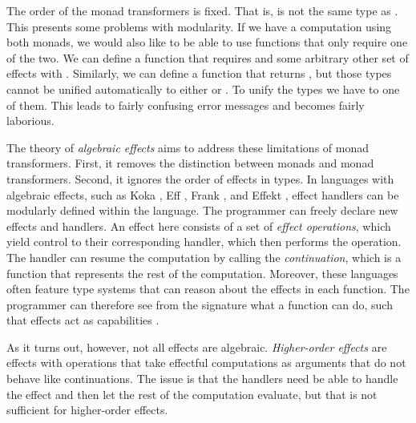 The order of the monad transformers is fixed. That is,  is not the same type as . This presents some problems with modularity. If we have a computation using both monads, we would also like to be able to use functions that only require one of the two. We can define a function that requires  and some arbitrary other set of effects with . Similarly, we can define a function that returns , but those types cannot be unified automatically to either  or . To unify the types we have to  one of them. This leads to fairly confusing error messages and becomes fairly laborious.

%
%

The theory of \emph{algebraic effects} aims to address these limitations of monad transformers. First, it removes the distinction between monads and monad transformers. Second, it ignores the order of effects in types. In languages with algebraic effects, such as Koka \autocite{leijen_koka_2014}, Eff \autocite{bauer_programming_2015}, Frank \autocite{lindley_be_2017}, and Effekt \autocite{brachthauser_effects_2020}, effect handlers can be modularly defined within the language. The programmer can freely declare new effects and handlers. An effect here consists of a set of \emph{effect operations}, which yield control to their corresponding handler, which then performs the operation. The handler can resume the computation by calling the \emph{continuation}, which is a function that represents the rest of the computation. Moreover, these languages often feature type systems that can reason about the effects in each function. The programmer can therefore see from the signature what a function can do, such that effects act as capabilities \autocite{brachthauser_effects_2020}.

As it turns out, however, not all effects are algebraic. \emph{Higher-order effects} are effects with operations that take effectful computations as arguments that do not behave like continuations. The issue is that the handlers need be able to handle the effect and then let the rest of the computation evaluate, but that is not sufficient for higher-order effects.

